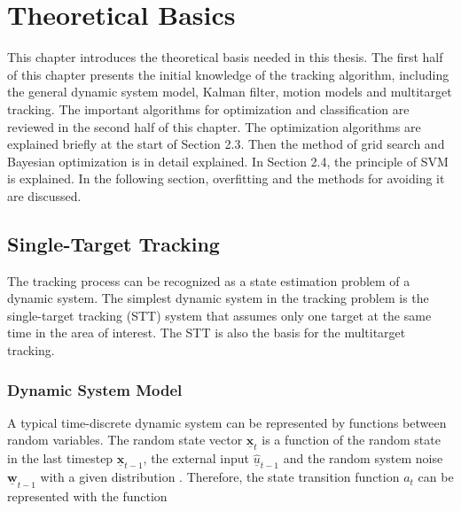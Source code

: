 \chapter{Theoretical Basics}

This chapter introduces the theoretical basis needed in this thesis. The first half of this chapter presents the initial knowledge of the tracking algorithm, including the general dynamic system model, Kalman filter, motion models and multitarget tracking. The important algorithms for optimization and classification are reviewed in the second half of this chapter. The optimization algorithms are explained briefly at the start of Section 2.3. Then the method of grid search and Bayesian optimization is in detail explained. In Section 2.4, the principle of SVM is explained. In the following section, overfitting and the methods for avoiding it are discussed.

\section{Single-Target Tracking}
\label{st}




The tracking process can be recognized as a state estimation problem of a dynamic system. The simplest dynamic system in the tracking problem is the single-target tracking (STT) system that assumes only one target at the same time in the area of interest. The STT is also the basis for the multitarget tracking.

\subsection{Dynamic System Model}

A typical time-discrete dynamic system can be represented by functions between random variables. The random state vector $\boldsymbol{\underline{x}}_{t}$ is a function of the random state in the last timestep $\boldsymbol{\underline{x}}_{t-1}$, the external input $\hat{\underline{u}}_{t-1}$ and the random system noise $\boldsymbol{\underline{w}}_{t-1}$ with a given distribution \cite{welch1995introduction}.  Therefore, the state transition function $a_{t}$  can be represented with the function

